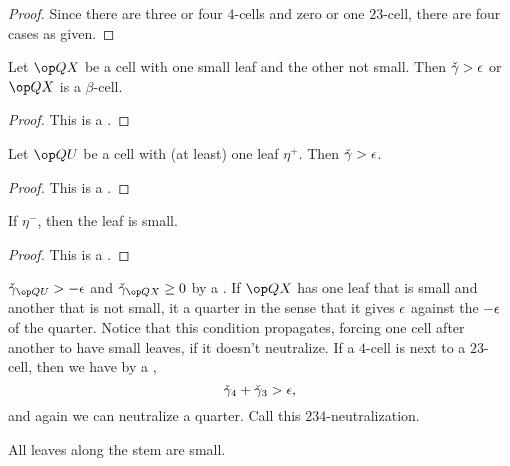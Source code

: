 \begin{proof} Since there are three or four $4$-cells and zero or one $23$-cell,
there are four cases as given.
\end{proof}

\begin{lemma} Let $\QX$ be a cell with one small leaf and the other not small.
Then $\check\gamma > \epsilon$ or $\QX$ is a $\beta$-cell.  
\end{lemma}

\begin{proof} This is a .
\end{proof}

\begin{lemma} 
Let $\QU$ be a cell with (at least) one leaf $\eta^+$.  Then $\check\gamma > \epsilon$.
\end{lemma}

\begin{proof} This is a .
\end{proof}

\begin{lemma} If $\eta^-$, then the leaf is small.
\end{lemma}

\begin{proof} This is a .
\end{proof}

\begin{remark}[neutralize]
 $\gg_{\QU} > -\eps$ and $\gg_{\QX}\ge 0$ by a .
If $\QX$ has one leaf that is small and another that is not small, 
it  a quarter in the
sense that it gives $\epsilon$ against the $-\epsilon$ of the quarter.
Notice that this condition propagates, forcing one cell after another to have
small leaves, if it doesn't neutralize.
If a $4$-cell is next to a $23$-cell, then we have by a ,
\[
\check\gamma_4 + \check\gamma_3 > \epsilon,
\]
and again we can neutralize a quarter.  Call this $234$-neutralization.
\end{remark}

\begin{lemma}  All leaves along the stem are small.
\end{lemma}

